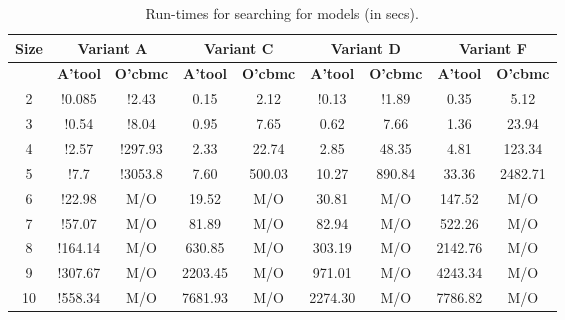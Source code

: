 \begin{table}[t]
  \centering
  \begin{tabular}[t]{|c|c|c|c|c|c|c|c|c|}\hline
    {\multirow{2}{*} \textbf{Size}}  & \multicolumn{2}{c|}{\textbf{Variant A}} & \multicolumn{2}{c|}{\textbf{Variant C}} & \multicolumn{2}{c|}{\textbf{Variant D}}  &  \multicolumn{2}{c|}{\textbf{Variant F}} \\\hline
   
   \cline{2-9}
    {} & {\textbf{A'tool}} & {\textbf{O'cbmc}} & {\textbf{A'tool}} & {\textbf{O'cbmc}} & {\textbf{A'tool}} & {\textbf{O'cbmc}} & {\textbf{A'tool}} & {\textbf{O'cbmc}} \\\hline
    
    2 & !0.085 & !2.43 & 0.15 & 2.12 & !0.13 & !1.89 & 0.35 & 5.12 \\\hline
    3 & !0.54 & !8.04 & 0.95  & 7.65 & 0.62 & 7.66  & 1.36 & 23.94\\\hline
    4 & !2.57 & !297.93 & 2.33 & 22.74 & 2.85 & 48.35  & 4.81 & 123.34\\\hline
    5 & !7.7 & !3053.8 & 7.60 & 500.03 & 10.27 & 890.84 & 33.36  & 2482.71 \\\hline
    6 & !22.98 & M/O & 19.52 & M/O & 30.81 & M/O  & 147.52 & M/O\\\hline
    7 & !57.07 & M/O & 81.89 & M/O & 82.94 & M/O & 522.26  & M/O \\\hline
    8 & !164.14 & M/O & 630.85 & M/O & 303.19 & M/O & 2142.76 & M/O\\\hline
    9 & !307.67 & M/O & 2203.45 & M/O & 971.01 & M/O & 4243.34 & M/O\\\hline
    10 & !558.34 & M/O & 7681.93 & M/O & 2274.30 & M/O & 7786.82 & M/O\\\hline
  \end{tabular}
  \caption{Run-times for searching for models (in secs).}
  \label{tab:qf-grabh}
\end{table}

%    

